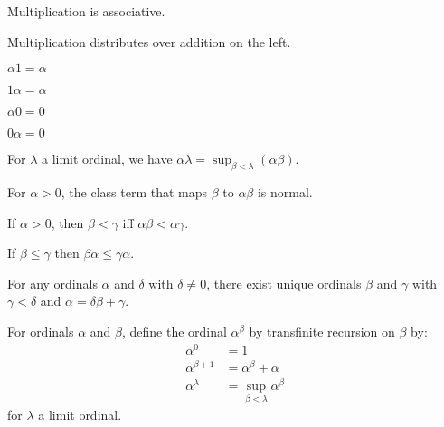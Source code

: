 \begin{theorem}
    Multiplication is associative.
\end{theorem}

\begin{theorem}
    Multiplication distributes over addition on the left.
\end{theorem}

\begin{theorem}
    $\alpha 1 = \alpha$
\end{theorem}

\begin{theorem}
    $1 \alpha = \alpha$
\end{theorem}

\begin{theorem}
    $\alpha 0 = 0$
\end{theorem}

\begin{theorem}
    $0 \alpha = 0$
\end{theorem}

\begin{theorem}
    For $\lambda$ a limit ordinal, we have $\alpha \lambda = \sup_{\beta < \lambda} (\alpha \beta)$.
\end{theorem}

\begin{theorem}
    For $\alpha > 0$, the class term that maps $\beta$ to $\alpha \beta$ is normal.
\end{theorem}

\begin{theorem}
    If $\alpha > 0$, then $\beta < \gamma$ iff $\alpha \beta < \alpha \gamma$.
\end{theorem}

\begin{theorem}
    If $\beta \leq \gamma$ then $\beta \alpha \leq \gamma \alpha$.
\end{theorem}

\begin{theorem}
For any ordinals $\alpha$ and $\delta$ with $\delta \neq 0$,
there exist unique ordinals $\beta$ and $\gamma$ with
$\gamma < \delta$ and $\alpha = \delta \beta + \gamma$.
\end{theorem}

\begin{definition}[Exponentiation]
    For ordinals $\alpha$ and $\beta$, define the ordinal $\alpha^\beta$
    by transfinite recursion on $\beta$ by:
    \begin{align*}
        \alpha^0 & = 1 \\
        \alpha^{\beta + 1} & = \alpha^\beta + \alpha \\
        \alpha^\lambda & = \sup_{\beta < \lambda} \alpha^\beta
    \end{align*}
    for $\lambda$ a limit ordinal.
\end{definition}

